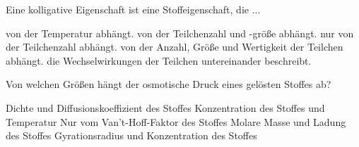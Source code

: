 \documentclass[11pt]{exam}
\begin{document}
\begin{questions}
\vspace{3mm}\question Eine kolligative Eigenschaft ist eine Stoffeigenschaft, die ...

\begin{choices}
	\choice von der Temperatur abhängt.
	\choice von der Teilchenzahl und -größe abhängt.
	\choice nur von der Teilchenzahl abhängt.
	\choice von der Anzahl, Größe und Wertigkeit der Teilchen abhängt.
	\choice die Wechselwirkungen der Teilchen untereinander beschreibt.
\end{choices}

\vspace{3mm}\question Von welchen Größen hängt der osmotische Druck eines gelösten Stoffes ab?

\begin{choices}
	\choice Dichte und Diffusionskoeffizient des Stoffes
	\choice Konzentration des Stoffes und Temperatur
	\choice Nur vom Van't-Hoff-Faktor des Stoffes
	\choice Molare Masse und Ladung des Stoffes
	\choice Gyrationsradius und Konzentration des Stoffes
\end{choices}

\vspace{3mm}\end{questions}
\end{document}

